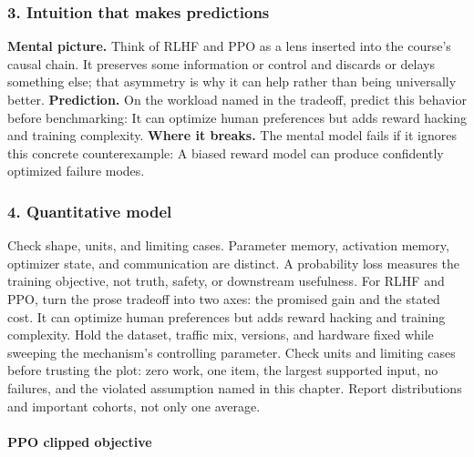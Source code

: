 \subsubsection*{3. Intuition that makes predictions}
\textbf{Mental picture.} Think of RLHF and PPO as a lens inserted into the course's causal chain. It preserves some information or control and discards or delays something else; that asymmetry is why it can help rather than being universally better.
\textbf{Prediction.} On the workload named in the tradeoff, predict this behavior before benchmarking: It can optimize human preferences but adds reward hacking and training complexity.
\textbf{Where it breaks.} The mental model fails if it ignores this concrete counterexample: A biased reward model can produce confidently optimized failure modes.
\subsubsection*{4. Quantitative model}
Check shape, units, and limiting cases. Parameter memory, activation memory, optimizer state, and communication are distinct. A probability loss measures the training objective, not truth, safety, or downstream usefulness.
For RLHF and PPO, turn the prose tradeoff into two axes: the promised gain and the stated cost. It can optimize human preferences but adds reward hacking and training complexity. Hold the dataset, traffic mix, versions, and hardware fixed while sweeping the mechanism's controlling parameter.
Check units and limiting cases before trusting the plot: zero work, one item, the largest supported input, no failures, and the violated assumption named in this chapter. Report distributions and important cohorts, not only one average.
\paragraph{PPO clipped objective}
